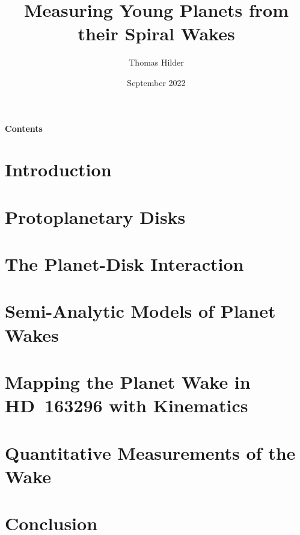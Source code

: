 \documentclass[hidelinks,11pt,a4paper,onecolumn]{report}
\title{Measuring Young Planets from their Spiral Wakes}
\author{Thomas Hilder}
\date{September 2022}
\begin{document}
    
    

    

    

    

    

    \begin{center}
      {\Large \textbf{Contents}}
    \end{center}
    \makeatletter
    \makeatother
    \clearpage

    \setcounter{footnote}{0} 

    \chapter{Introduction}
    

    \chapter{Protoplanetary Disks}
    

    \chapter{The Planet-Disk Interaction}
    

    \chapter{Semi-Analytic Models of Planet Wakes} \label{ch:wake_models}
    

    \chapter{Mapping the Planet Wake in HD~163296 with Kinematics} \label{ch:wake_mapping}
    

    \chapter{Quantitative Measurements of the Wake}
    

    \chapter{Conclusion}
    

    \appendix
    

    
    
\end{document}
